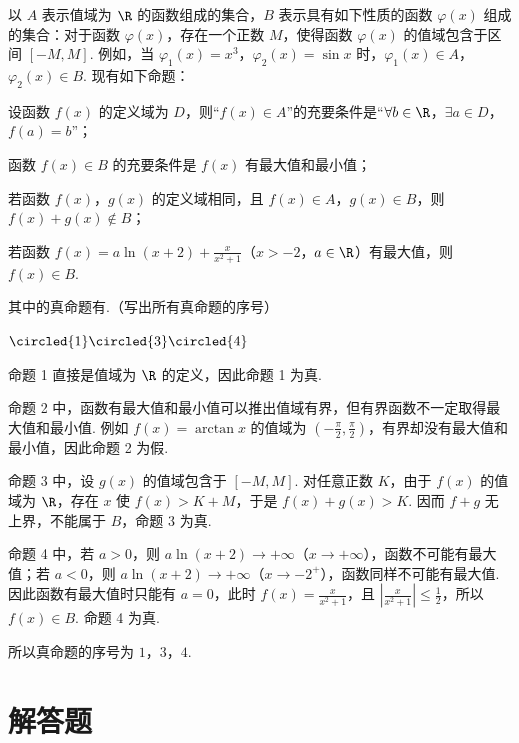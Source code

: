 \begin{problem}
以 \(A\) 表示值域为 \(\R\) 的函数组成的集合，\(B\) 表示具有如下性质的函数 \(\varphi(x)\) 组成的集合：对于函数 \(\varphi(x)\)，存在一个正数 \(M\)，使得函数 \(\varphi(x)\) 的值域包含于区间 \([-M, M]\). 例如，当 \(\varphi_{1}(x) = x^{3}\)，\(\varphi_{2}(x) = \sin x\) 时，\(\varphi_{1}(x) \in A\)，\(\varphi_{2}(x) \in B\). 现有如下命题：

\begin{circlelist}
\item 设函数 \(f(x)\) 的定义域为 \(D\)，则“\(f(x) \in A\)”的充要条件是“\(\forall b \in \R\)，\(\exists a \in D\)，\(f(a)=b\)”；
\item 函数 \(f(x) \in B\) 的充要条件是 \(f(x)\) 有最大值和最小值；
\item 若函数 \(f(x)\)，\(g(x)\) 的定义域相同，且 \(f(x) \in A\)，\(g(x) \in B\)，则 \(f(x)+g(x) \notin B\)；
\item 若函数 \(f(x) = a\ln(x + 2) + \frac{x}{x^{2} + 1}\)（\(x > -2\)，\(a \in \R\)）有最大值，则 \(f(x) \in B\).
\end{circlelist}

其中的真命题有\fillinblank{}.（写出所有真命题的序号）
\begin{answer}
\(\circled{1}\circled{3}\circled{4}\)
\end{answer}

\begin{solution}
命题 1 直接是值域为 \(\R\) 的定义，因此命题 1 为真.

命题 2 中，函数有最大值和最小值可以推出值域有界，但有界函数不一定取得最大值和最小值. 例如 \(f(x)=\arctan x\) 的值域为 \(\left(-\frac\pi2,\frac\pi2\right)\)，有界却没有最大值和最小值，因此命题 2 为假.

命题 3 中，设 \(g(x)\) 的值域包含于 \([-M,M]\). 对任意正数 \(K\)，由于 \(f(x)\) 的值域为 \(\R\)，存在 \(x\) 使 \(f(x)>K+M\)，于是 \(f(x)+g(x)>K\). 因而 \(f+g\) 无上界，不能属于 \(B\)，命题 3 为真.

命题 4 中，若 \(a>0\)，则 \(a\ln(x+2)\to+\infty\)（\(x\to+\infty\)），函数不可能有最大值；若 \(a<0\)，则 \(a\ln(x+2)\to+\infty\)（\(x\to-2^+\)），函数同样不可能有最大值. 因此函数有最大值时只能有 \(a=0\)，此时 \(f(x)=\frac{x}{x^2+1}\)，且 \(\left|\frac{x}{x^2+1}\right|\leqslant\frac12\)，所以 \(f(x)\in B\). 命题 4 为真.

所以真命题的序号为 \(1\)，\(3\)，\(4\).
\end{solution}
\end{problem}

\section{解答题}

